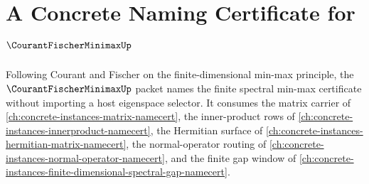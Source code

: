 \chapter{A Concrete Naming Certificate for $\CourantFischerMinimaxUp$}
\label{ch:concrete-instances-courant-fischer-minimax-namecert}

Following Courant and Fischer on the finite-dimensional min-max principle, the $\CourantFischerMinimaxUp$ packet names the finite spectral min-max certificate without importing a host eigenspace selector. It consumes the matrix carrier of \autoref{ch:concrete-instances-matrix-namecert}, the inner-product rows of \autoref{ch:concrete-instances-innerproduct-namecert}, the Hermitian surface of \autoref{ch:concrete-instances-hermitian-matrix-namecert}, the normal-operator routing of \autoref{ch:concrete-instances-normal-operator-namecert}, and the finite gap window of \autoref{ch:concrete-instances-finite-dimensional-spectral-gap-namecert}.

